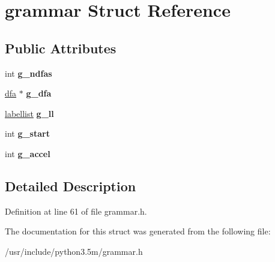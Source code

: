 \hypertarget{structgrammar}{}\section{grammar Struct Reference}
\label{structgrammar}
\subsection*{Public Attributes}
\begin{DoxyCompactItemize}
\item 
int {\bfseries g\+\_\+ndfas}\hypertarget{structgrammar_abf22ce0269bc0d85b5664fc390f5441f}{}\label{structgrammar_abf22ce0269bc0d85b5664fc390f5441f}

\item 
\hyperlink{structdfa}{dfa} $\ast$ {\bfseries g\+\_\+dfa}\hypertarget{structgrammar_a5f1487bf454c13350ffbd11ed08cd160}{}\label{structgrammar_a5f1487bf454c13350ffbd11ed08cd160}

\item 
\hyperlink{structlabellist}{labellist} {\bfseries g\+\_\+ll}\hypertarget{structgrammar_a44c2b2bf052d04fe115c96ebcd3cdb6d}{}\label{structgrammar_a44c2b2bf052d04fe115c96ebcd3cdb6d}

\item 
int {\bfseries g\+\_\+start}\hypertarget{structgrammar_a07f66956b24bcf1d2560f64e97738843}{}\label{structgrammar_a07f66956b24bcf1d2560f64e97738843}

\item 
int {\bfseries g\+\_\+accel}\hypertarget{structgrammar_a6bfa088665e4923c32933b3f40343ce2}{}\label{structgrammar_a6bfa088665e4923c32933b3f40343ce2}

\end{DoxyCompactItemize}


\subsection{Detailed Description}


Definition at line 61 of file grammar.\+h.



The documentation for this struct was generated from the following file\+:\begin{DoxyCompactItemize}
\item 
/usr/include/python3.\+5m/grammar.\+h\end{DoxyCompactItemize}
